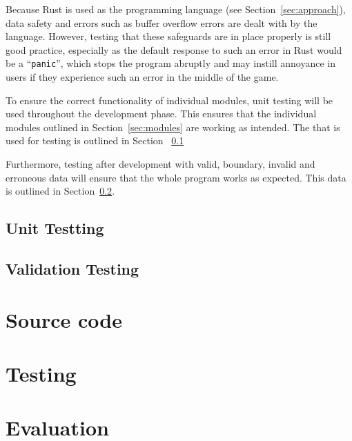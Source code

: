\documentclass[11pt]{article}
\begin{document}
Because Rust is used as the programming language (see Section~\ref{sec:approach}), data safety
and errors such as buffer overflow errors are dealt with by the language. However, testing that
these safeguards are in place properly is still good practice, especially as the default response
to such an error in Rust would be a ``\texttt{panic}'', which stops the program abruptly and may
instill annoyance in users if they experience such an error in the middle of the game.

To ensure the correct functionality of individual modules, unit testing will be used throughout
the development phase. This ensures that the individual modules outlined in Section~\ref{sec:modules}
are working as intended. The that is used for testing is outlined in Section ~\ref{sec:unit-test}

Furthermore, testing after development with valid, boundary, invalid and erroneous data will ensure
that the whole program works as expected. This data is outlined in Section~\ref{sec:whole-test}.
\subsection{Unit Testting}
\label{sec:unit-test}
\subsection{Validation Testing}
\label{sec:whole-test}
\section{Source code}
\section{Testing}
\section{Evaluation}
\end{document}

